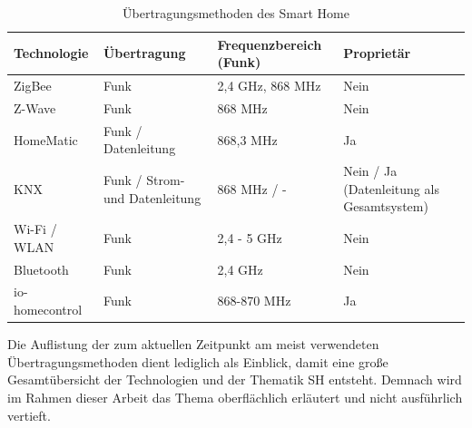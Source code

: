     \begin{table}[hbt!]
        \begin{center}
            \begin{tabular}{| p{3.25cm} | p{3.25cm} | p{3.25cm} | p{3.25cm} |}
                \hline
                    \textbf{Technologie} & \textbf{Übertragung} & \textbf{Frequenzbereich (Funk)} & \textbf{Proprietär} \\
                \hline
                    ZigBee & Funk & 2,4 GHz, 868 MHz & Nein \\ 
                \hline
                    Z-Wave & Funk & 868 MHz & Nein \\ 
                \hline
                    HomeMatic & Funk / Datenleitung & 868,3 MHz & Ja \\
                \hline
                    KNX & Funk / Strom- und Datenleitung & 868 MHz / - & Nein / Ja (Datenleitung als Gesamtsystem) \\
                \hline
                    Wi-Fi / WLAN & Funk & 2,4 - 5 GHz & Nein \\
                \hline 
                    Bluetooth & Funk & 2,4 GHz & Nein \\
                \hline
                    io-homecontrol & Funk & 868-870 MHz & Ja \\
                \hline
            \end{tabular}
        \end{center}
        \caption{Übertragungsmethoden des Smart Home}
        \label{tab:protocolsSH}
    \end{table}
    Die Auflistung der zum aktuellen Zeitpunkt am meist verwendeten Übertragungsmethoden dient 
    lediglich als Einblick, damit eine große Gesamtübersicht der Technologien und der Thematik \acl{SH} entsteht. 
    Demnach wird im Rahmen dieser Arbeit das Thema oberflächlich erläutert und nicht ausführlich vertieft.


